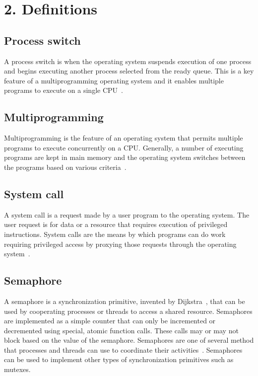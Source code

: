 \documentclass[12pt]{article}
\date{\today}
\begin{document}
\maketitle

\section*{2. Definitions}
\subsection*{Process switch}
A process switch is when the operating system suspends execution of
one process and begins executing another process selected from the
ready queue.  This is a key feature of a multiprogramming operating
system and it enables multiple programs to execute on a single CPU~\cite{stallings}.

\subsection*{Multiprogramming}
Multiprogramming is the feature of an operating system that permits
multiple programs to execute concurrently on a CPU. Generally, a
number of executing programs are kept in main memory and the
operating system switches between the programs based on various
criteria~\cite{stallings}.

\subsection*{System call}
A system call is a request made by a user program to the operating
system.  The user request is for data or a resource that requires
execution of privileged instructions.  System calls are the means by
which programs can do work requiring privileged access by proxying
those requests through the operating system~\cite{stallings}.

\subsection*{Semaphore}
A semaphore is a synchronization primitive, invented by
Dijkstra~\cite{wikipedia-semaphore}, that can be used by cooperating
processes or threads to access a shared resource.  Semaphores are
implemented as a simple counter that can only be incremented or
decremented using special, atomic function calls.  These calls may or
may not block based on the value of the semaphore.  Semaphores are one
of several method that processes and threads can use to coordinate
their activities~\cite{stallings}.  Semaphores can be used to
implement other types of synchronization primitives such as mutexes.
\end{document}
